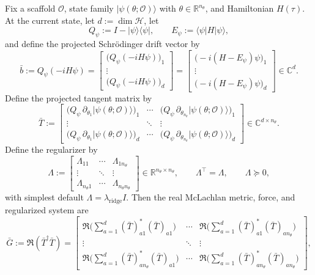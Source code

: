 \documentclass[11pt]{article}
\begin{document}
Fix a scaffold \(\mathcal O\), state family \(|\psi(\theta;\mathcal O)\rangle\) with \(\theta\in\mathbb R^{n_\theta}\), and Hamiltonian \(H(\tau)\). At the current state, let \(d:=\dim\mathcal H\), let
\[
Q_\psi:=I-|\psi\rangle\langle\psi|,
\qquad
E_\psi:=\langle\psi|H|\psi\rangle,
\]
and define the projected Schr\"odinger drift vector by
\[
\bar b
:=
Q_\psi(-iH\psi)
=
\left[
\begin{array}{c}
\bigl(Q_\psi(-iH\psi)\bigr)_1\\
\vdots\\
\bigl(Q_\psi(-iH\psi)\bigr)_d
\end{array}
\right]
=
\left[
\begin{array}{c}
\bigl(-i(H-E_\psi)\psi\bigr)_1\\
\vdots\\
\bigl(-i(H-E_\psi)\psi\bigr)_d
\end{array}
\right]
\in\mathbb C^d.
\]
Define the projected tangent matrix by
\[
\bar T
:=
\left[
\begin{array}{ccc}
\bigl(Q_\psi\,\partial_{\theta_1}|\psi(\theta;\mathcal O)\rangle\bigr)_1
&
\cdots
&
\bigl(Q_\psi\,\partial_{\theta_{n_\theta}}|\psi(\theta;\mathcal O)\rangle\bigr)_1
\\
\vdots & \ddots & \vdots\\
\bigl(Q_\psi\,\partial_{\theta_1}|\psi(\theta;\mathcal O)\rangle\bigr)_d
&
\cdots
&
\bigl(Q_\psi\,\partial_{\theta_{n_\theta}}|\psi(\theta;\mathcal O)\rangle\bigr)_d
\end{array}
\right]
\in\mathbb C^{d\times n_\theta}.
\]
Define the regularizer by
\[
\Lambda
:=
\left[
\begin{array}{ccc}
\Lambda_{11} & \cdots & \Lambda_{1n_\theta}\\
\vdots & \ddots & \vdots\\
\Lambda_{n_\theta 1} & \cdots & \Lambda_{n_\theta n_\theta}
\end{array}
\right]
\in\mathbb R^{n_\theta\times n_\theta},
\qquad
\Lambda^\top=\Lambda,
\qquad
\Lambda\succeq 0,
\]
with simplest default \(\Lambda=\lambda_{\mathrm{ridge}}I\). Then the real McLachlan metric, force, and regularized system are
\[
\bar G:=\Re(\bar T^\dagger\bar T)
=
\left[
\begin{array}{ccc}
\Re\!\bigl(\sum_{a=1}^{d}(\bar T)_{a1}^*(\bar T)_{a1}\bigr)
&
\cdots
&
\Re\!\bigl(\sum_{a=1}^{d}(\bar T)_{a1}^*(\bar T)_{a n_\theta}\bigr)
\\
\vdots & \ddots & \vdots\\
\Re\!\bigl(\sum_{a=1}^{d}(\bar T)_{a n_\theta}^*(\bar T)_{a1}\bigr)
&
\cdots
&
\Re\!\bigl(\sum_{a=1}^{d}(\bar T)_{a n_\theta}^*(\bar T)_{a n_\theta}\bigr)
\end{array}
\right],
\]
\end{document}
